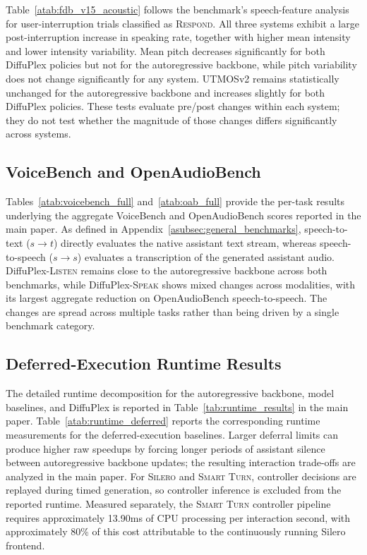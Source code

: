 Table~\ref{atab:fdb_v15_acoustic} follows the benchmark's speech-feature analysis for user-interruption trials classified as \textsc{Respond}.
All three systems exhibit a large post-interruption increase in speaking rate, together with higher mean intensity and lower intensity variability.
Mean pitch decreases significantly for both DiffuPlex policies but not for the autoregressive backbone, while pitch variability does not change significantly for any system.
UTMOSv2 remains statistically unchanged for the autoregressive backbone and increases slightly for both DiffuPlex policies.
These tests evaluate pre/post changes within each system; they do not test whether the magnitude of those changes differs significantly across systems.




\subsection{VoiceBench and OpenAudioBench}
\label{asubsec:additional_general}

Tables~\ref{atab:voicebench_full} and~\ref{atab:oab_full} provide the per-task results underlying the aggregate VoiceBench and OpenAudioBench scores reported in the main paper.
As defined in Appendix~\ref{asubsec:general_benchmarks}, speech-to-text ($s\!\rightarrow\!t$) directly evaluates the native assistant text stream, whereas speech-to-speech ($s\!\rightarrow\!s$) evaluates a transcription of the generated assistant audio.
DiffuPlex-\textsc{Listen} remains close to the autoregressive backbone across both benchmarks, while DiffuPlex-\textsc{Speak} shows mixed changes across modalities, with its largest aggregate reduction on OpenAudioBench speech-to-speech.
The changes are spread across multiple tasks rather than being driven by a single benchmark category.

\subsection{Deferred-Execution Runtime Results}
\label{asubsec:additional_runtime}

The detailed runtime decomposition for the autoregressive backbone, model baselines, and DiffuPlex is reported in Table~\ref{tab:runtime_results} in the main paper.
Table~\ref{atab:runtime_deferred} reports the corresponding runtime measurements for the deferred-execution baselines.
Larger deferral limits can produce higher raw speedups by forcing longer periods of assistant silence between autoregressive backbone updates; the resulting interaction trade-offs are analyzed in the main paper.
For \textsc{Silero} and \textsc{Smart Turn}, controller decisions are replayed during timed generation, so controller inference is excluded from the reported runtime.
Measured separately, the \textsc{Smart Turn} controller pipeline requires approximately 13.90ms of CPU processing per interaction second, with approximately 80\% of this cost attributable to the continuously running Silero frontend.


